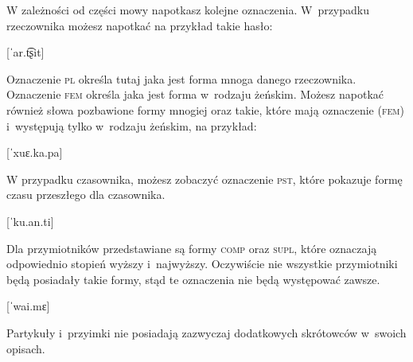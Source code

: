 \begin{spacing}{1.1}
W zależności od części mowy napotkasz kolejne oznaczenia. W~przypadku
rzeczownika możesz napotkać na przykład takie hasło:

[ˈar.t͡ʂit]
\skipline

Oznaczenie \textsc{pl} określa tutaj jaka jest forma mnoga danego rzeczownika.
Oznaczenie \textsc{fem} określa jaka jest forma w~rodzaju żeńskim. Możesz
napotkać również słowa pozbawione formy mnogiej oraz takie, które mają
oznaczenie (\textsc{fem}) i~występują tylko w~rodzaju żeńskim, na przykład:

[ˈxuɛ.ka.pa]
\skipline

W przypadku czasownika, możesz zobaczyć oznaczenie \textsc{pst}, które pokazuje
formę czasu przeszłego dla czasownika.

[ˈku.an.ti]
\skipline

Dla przymiotników przedstawiane są formy \textsc{comp} oraz \textsc{supl}, które
oznaczają odpowiednio stopień wyższy i~najwyższy. Oczywiście nie wszystkie
przymiotniki będą posiadały takie formy, stąd te oznaczenia nie będą występować
zawsze.

[ˈwai.mɛ]
\skipline

Partykuły i~przyimki nie posiadają zazwyczaj dodatkowych skrótowców w~swoich
opisach.

\skipline

\end{spacing}